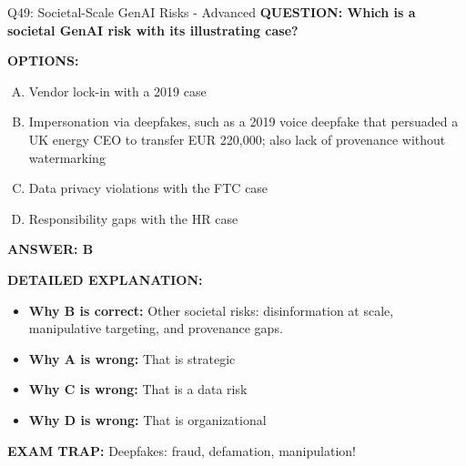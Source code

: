 \documentclass[8pt]{beamer}
\begin{document}
\begin{frame}[shrink=6]{Q49: Societal-Scale GenAI Risks - Advanced}
\fontsize{6.5}{7.5}\selectfont
\textbf{QUESTION: Which is a societal GenAI risk with its illustrating case?}

\vspace{0.1cm}
\textbf{OPTIONS:}
\begin{enumerate}[A.]
\item Vendor lock-in with a 2019 case
\item Impersonation via deepfakes, such as a 2019 voice deepfake that persuaded a UK energy CEO to transfer EUR 220,000; also lack of provenance without watermarking
\item Data privacy violations with the FTC case
\item Responsibility gaps with the HR case
\end{enumerate}

\vspace{0.1cm}
\textcolor{myblue}{\textbf{ANSWER: B}}

\vspace{0.1cm}
\textbf{DETAILED EXPLANATION:}
\begin{itemize}
\item \textbf{Why B is correct:} Other societal risks: disinformation at scale, manipulative targeting, and provenance gaps.
\item \textbf{Why A is wrong:} That is strategic
\item \textbf{Why C is wrong:} That is a data risk
\item \textbf{Why D is wrong:} That is organizational
\end{itemize}

\textcolor{myred}{\textbf{EXAM TRAP:}} Deepfakes: fraud, defamation, manipulation!
\end{frame}
\end{document}
